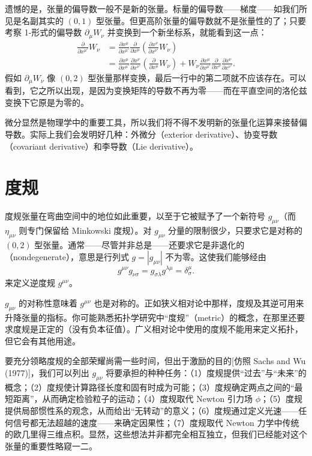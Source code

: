 遗憾的是，张量的偏导数一般不是新的张量。标量的偏导数——梯度——如我们所见是名副其实的 $(0,1)$ 型张量。但更高阶张量的偏导数就不是张量性的了；只要考察 1-形式的偏导数 $\partial_\mu W_\nu$ 并变换到一个新坐标系，就能看到这一点：
\begin{align*}
\frac{\partial}{\partial x^{\mu'}}W_\nu&=\frac{\partial x^\mu}{\partial x^{\mu'}}\frac{\partial}{\partial x^\mu}\left(\frac{\partial x^\nu}{\partial x^{\nu'}}W_\nu\right)\\
&=\frac{\partial x^\mu}{\partial x^{\mu'}}\frac{\partial x^\nu}{\partial x^{\nu'}}\left(\frac{\partial}{\partial x^\mu}W_\nu\right)+W_\nu\frac{\partial x^\mu}{\partial x^{\mu'}}\frac{\partial}{\partial x^\nu}\frac{\partial x^\nu}{\partial x^{\nu'}}. \tag{2.38}
\end{align*}
假如 $\partial_\mu W_\nu$ 像 $(0,2)$ 型张量那样变换，最后一行中的第二项就不应该存在。可以看到，它之所以出现，是因为变换矩阵的导数不再为零——而在平直空间的洛伦兹变换下它原是为零的。

微分显然是物理学中的重要工具，所以我们将不得不发明新的张量化运算来接替偏导数。实际上我们会发明好几种：外微分（exterior derivative）、协变导数（covariant derivative）和李导数（Lie derivative）。

\section{度规}

度规张量在弯曲空间中的地位如此重要，以至于它被赋予了一个新符号 $g_{\mu\nu}$（而 $\eta_{\mu\nu}$ 则专门保留给 Minkowski 度规）。对 $g_{\mu\nu}$ 分量的限制很少，只要求它是对称的 $(0,2)$ 型张量。通常——尽管并非总是——还要求它是非退化的（nondegenerate），意思是行列式 $g=|g_{\mu\nu}|$ 不为零。这使我们能够经由
\begin{equation*}
g^{\mu\nu}g_{\nu\sigma}=g_{\sigma\lambda}g^{\lambda\mu}=\delta^\mu_\sigma. \tag{2.39}
\end{equation*}
来定义逆度规 $g^{\mu\nu}$。

$g_{\mu\nu}$ 的对称性意味着 $g^{\mu\nu}$ 也是对称的。正如狭义相对论中那样，度规及其逆可用来升降张量的指标。你可能熟悉拓扑学研究中“度规”（metric）的概念，在那里还要求度规是正定的（没有负本征值）。广义相对论中使用的度规不能用来定义拓扑，但它会有其他用途。

要充分领略度规的全部荣耀尚需一些时间，但出于激励的目的[仿照 Sachs and Wu (1977)]，我们可以列出 $g_{\mu\nu}$ 将要承担的种种任务：（1）度规提供“过去”与“未来”的概念；（2）度规使计算路径长度和固有时成为可能；（3）度规确定两点之间的“最短距离”，从而确定检验粒子的运动；（4）度规取代 Newton 引力场 $\phi$；（5）度规提供局部惯性系的观念，从而给出“无转动”的意义；（6）度规通过定义光速——任何信号都无法超越的速度——来确定因果性；（7）度规取代 Newton 力学中传统的欧几里得三维点积。显然，这些想法并非都完全相互独立，但我们已经能对这个张量的重要性略窥一二。

